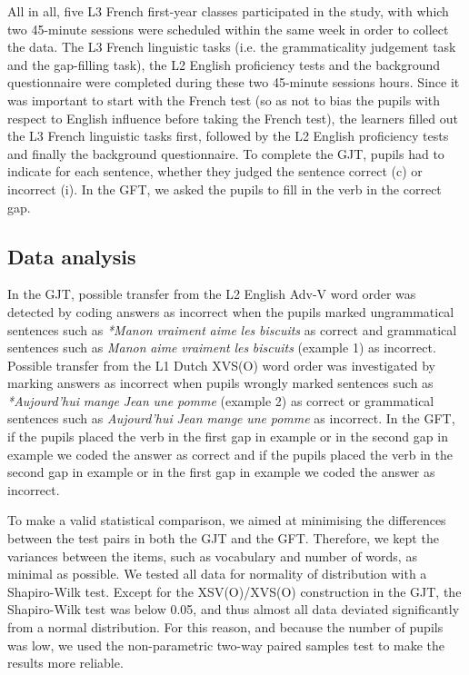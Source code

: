 \documentclass[output=paper,modfonts,nonflat, newtxmath]{langsci/langscibook}
\begin{document}
All in all, five L3 French first-year classes participated in the study, with which two 45-minute sessions were scheduled within the same week in order to collect the data. The L3 French linguistic tasks (i.e. the grammaticality judgement task and the gap-filling task), the L2 English proficiency tests and the background questionnaire were completed during these two 45-minute sessions hours. Since it was important to start with the French test (so as not to bias the pupils with respect to English influence before taking the French test), the learners filled out the L3 French linguistic tasks first, followed by the L2 English proficiency tests and finally the background questionnaire. To complete the GJT, pupils had to indicate for each sentence, whether they judged the sentence correct (c) or incorrect (i). In the GFT, we asked the pupils to fill in the verb in the correct gap.

\subsection{{Data} {analysis} }
\label{sec:stadt:3.5}

In the GJT, possible transfer from the L2 English Adv-V word order was detected by coding answers as incorrect when the pupils marked ungrammatical sentences such as \textit{*Manon} \textit{vraiment} \textit{aime} \textit{les} \textit{biscuits} as correct and grammatical sentences such as \textit{Manon} \textit{aime} \textit{vraiment} \textit{les} \textit{biscuits} (example 1) as incorrect. Possible transfer from the L1 Dutch XVS(O) word order was investigated by marking answers as incorrect when pupils wrongly marked sentences such as \textit{*Aujourd’hui} \textit{mange} \textit{Jean} \textit{une} \textit{pomme} (example 2) as correct or grammatical sentences such as \textit{Aujourd’hui} \textit{Jean} \textit{mange} \textit{une} \textit{pomme} as incorrect. In the GFT, if the pupils placed the verb in the first gap in example  or in the second gap in example  we coded the answer as correct and if the pupils placed the verb in the second gap in example  or in the first gap in example  we coded the answer as incorrect.

To make a valid statistical comparison, we aimed at minimising the differences between the test pairs in both the GJT and the GFT. Therefore, we kept the variances between the items, such as vocabulary and number of words, as minimal as possible. We tested all data for normality of distribution with a Shapiro-Wilk test. Except for the XSV(O)/XVS(O) construction in the GJT, the Shapiro-Wilk test was below 0.05, and thus almost all data deviated significantly from a normal distribution. For this reason, and because the number of pupils was low, we used the non-parametric two-way paired samples test to make the results more reliable.
\end{document}
